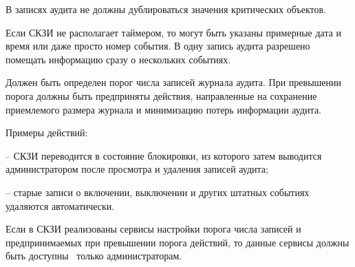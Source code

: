 В записях аудита не должны дублироваться значения критических объектов.

\begin{note}
Если СКЗИ не располагает таймером, то могут быть указаны примерные дата и время
или даже просто номер события.
%
В одну запись аудита разрешено помещать информацию сразу о нескольких событиях. 
\end{note}


\label{R.AU.Over} %
Должен быть определен порог числа записей журнала аудита.
При превышении порога должны быть предприняты действия,
направленные на сохранение приемлемого размера журнала
и минимизацию потерь информации аудита.

\begin{note}
Примеры действий:

-- СКЗИ переводится в состояние блокировки, из которого затем выводится
администратором после просмотра и удаления записей аудита;

-- старые записи о включении, выключении и других штатных событиях удаляются 
автоматически. 
\end{note}

\label{R.AU.Settings} %
Если в СКЗИ реализованы сервисы настройки порога числа записей и 
предпринимаемых при превышении порога действий, то данные сервисы должны 
быть доступны~ только администраторам. 

